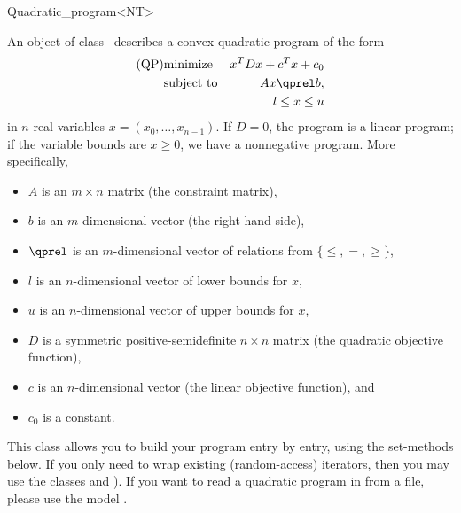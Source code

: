 \begin{ccRefClass}{Quadratic_program<NT>}


\ccDefinition
An object of class \ccRefName\ describes a convex quadratic program of the form
\begin{eqnarray*}
\mbox{(QP)}& \mbox{minimize} & x^{T}Dx+c^{T}x+c_0 \\
&\mbox{subject to}   & Ax\qprel b, \\
&                    & l \leq x \leq u
\end{eqnarray*}
in $n$ real variables $x=(x_0,\ldots,x_{n-1})$. If $D=0$, the program is
a linear program; if the variable bounds are $x\geq 0$, we have a 
nonnegative program. More specifically,  
\begin{itemize}
\item $A$ is an $m\times n$ matrix (the constraint matrix), 
\item $b$ is an $m$-dimensional vector (the right-hand side),
\item $\qprel$ is an $m$-dimensional vector of relations 
from $\{\leq, =, \geq\}$, 
\item $l$ is an $n$-dimensional vector of lower
bounds for $x$,
\item $u$ is an $n$-dimensional vector of upper bounds for
$x$, 
\item $D$ is a symmetric positive-semidefinite $n\times n$ matrix (the
  quadratic objective function),
\item $c$ is an $n$-dimensional vector (the linear objective
  function), and 
\item $c_0$ is a constant.
\end{itemize}

This class allows you to build your program entry by entry, using
the set-methods below. If you only need to wrap existing (random-access)
iterators, then you may use the classes 
 and ). If you want
to read a quadratic program in  from a file, please use
the model .

\ccIsModel
{}\\
\\
\\


\end{ccRefClass}
